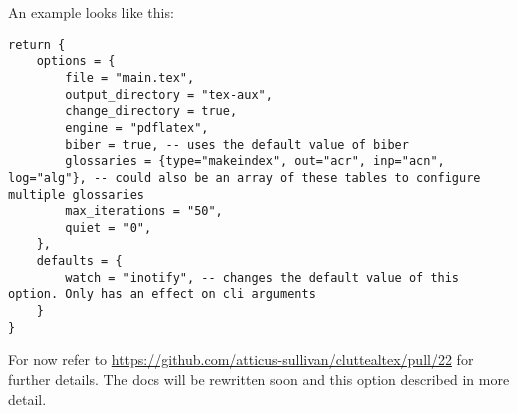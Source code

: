 \documentclass[a4paper]{report}
\begin{document}
An example looks like this:
\begin{verbatim}
return {
	options = {
		file = "main.tex",
		output_directory = "tex-aux",
		change_directory = true,
		engine = "pdflatex",
		biber = true, -- uses the default value of biber
		glossaries = {type="makeindex", out="acr", inp="acn", log="alg"}, -- could also be an array of these tables to configure multiple glossaries
		max_iterations = "50",
		quiet = "0",
	},
	defaults = {
		watch = "inotify", -- changes the default value of this option. Only has an effect on cli arguments 
	}
}
\end{verbatim}

For now refer to \url{https://github.com/atticus-sullivan/cluttealtex/pull/22} for further details.
The docs will be rewritten soon and this option described in more detail.
\end{document}
